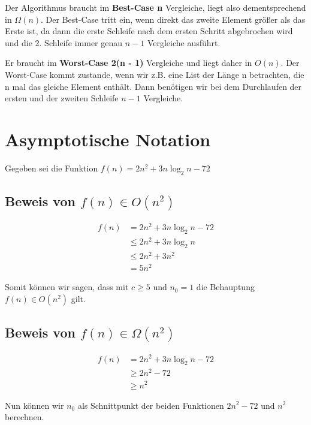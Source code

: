 \documentclass{article}
\begin{document}
Der Algorithmus braucht im \textbf{Best-Case n} Vergleiche, liegt also dementsprechend in $\Omega(n)$. Der Best-Case tritt ein,
wenn direkt das zweite Element größer als das Erste ist, da dann die erste Schleife nach dem ersten Schritt abgebrochen wird und
die 2. Schleife immer genau $n - 1$ Vergleiche ausführt.

Er braucht im \textbf{Worst-Case 2(n - 1)} Vergleiche und liegt daher in $O(n)$. Der Worst-Case kommt zustande, wenn wir z.B. eine
List der Länge n betrachten, die n mal das gleiche Element enthält. Dann benötigen wir bei dem Durchlaufen der ersten und der zweiten
Schleife $n - 1$ Vergleiche.

\section{Asymptotische Notation}

Gegeben sei die Funktion $f(n) = 2n^2 + 3n\log_2n - 72$

\subsection{Beweis von $f(n) \in O(n^2)$}

\begin{align*}
	f(n) & = 2n^2 + 3n\log_2n - 72 \\
	     & \leq 2n^2 + 3n\log_2n   \\
	     & \leq 2n^2 + 3n^2        \\
	     & = 5n^2
\end{align*}

\begin{flushleft}
	Somit können wir sagen, dass mit $c \geq 5$ und $n_0 = 1$ die Behauptung $f(n) \in O(n^2)$ gilt.
\end{flushleft}

\subsection{Beweis von $f(n) \in \Omega(n^2)$}

\begin{align*}
	f(n) & = 2n^2 + 3n\log_2n - 72 \\
	     & \geq 2n^2 - 72          \\
	     & \geq n^2
\end{align*}

\begin{flushleft}
	Nun können wir $n_0$ als Schnittpunkt der beiden Funktionen $2n^2 - 72$ und $n^2$ berechnen.
\end{flushleft}
\end{document}
